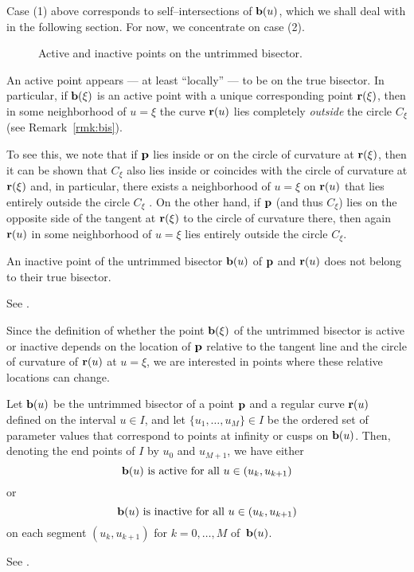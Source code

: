 Case (1) above corresponds to self--intersections of ${\bf b}(u)$,
which we shall deal with in the following section. For now, we
concentrate on case (2).

\begin{figure}[htbp] \vspace{2.4in}
\caption[]{Active and inactive points on the untrimmed bisector.}
\label{fig:active} \end{figure}

An active point appears --- at least ``locally'' --- to be on
the true bisector. In particular, if ${\bf b}(\xi)$ is an active
point with a unique corresponding point ${\bf r}(\xi)$, then in
some neighborhood of $u=\xi$ the curve ${\bf r}(u)$ lies completely
{\it outside\/} the circle $C_\xi$ (see Remark~\ref{rmk:bis}).

To see this, we note that if ${\bf p}$ lies inside or on the
circle of curvature at ${\bf r}(\xi)$, then it can be shown \cite
[Lemma~3.1]{farouki91} that $C_\xi$ also lies inside or coincides
with the circle of curvature at ${\bf r}(\xi)$ and, in particular,
there exists a neighborhood of $u=\xi$ on ${\bf r}(u)$ that lies
entirely outside the circle $C_\xi$ \cite[p.~176]{H52}. On the
other hand, if ${\bf p}$ (and thus $C_\xi$) lies on the opposite
side of the tangent at ${\bf r}(\xi)$ to the circle of curvature
there, then again ${\bf r}(u)$ in some neighborhood of $u=\xi$
lies entirely outside the circle $C_\xi$.

\begin{rmk} {\rm
An inactive point of the untrimmed bisector ${\bf b}(u)$ of ${\bf p}$
and ${\bf r}(u)$ does not belong to their true bisector. }
\end{rmk}
\prf See \cite[Proposition~3.1]{farouki91}. \QED

Since the definition of whether the point ${\bf b}(\xi)$ of the
untrimmed bisector is active or inactive depends on the location of
${\bf p}$ relative to the tangent line and the circle of curvature
of ${\bf r}(u)$ at $u=\xi$, we are interested in points where these
relative locations can change.

\begin{thm}
\label{thm:active}
Let ${\bf b}(u)$ be the untrimmed bisector of a point ${\bf p}$
and a regular curve ${\bf r}(u)$ defined on the interval $u \in I$,
and let $\{u_1,\ldots,u_M\} \in I$ be the ordered set of parameter
values that correspond to points at infinity or cusps on ${\bf b}
(u)$. Then, denoting the end points of $I$ by $u_0$ and $u_{M+1}$,
we have either
\begin{equation}
{\bf b}(u) {\rm \ is\ active\ for\ all\ } u \in (u_k,u_{k+1})
\end{equation}
or
\begin{equation}
{\bf b}(u) {\rm \ is\ inactive\ for\ all\ } u \in (u_k,u_{k+1})
\end{equation}
on each segment $(u_k,u_{k+1})$ for $k=0,\ldots,M$ of $\,{\bf b}(u)$.
\end{thm}
\prf  See \cite{farouki91}. \QED

